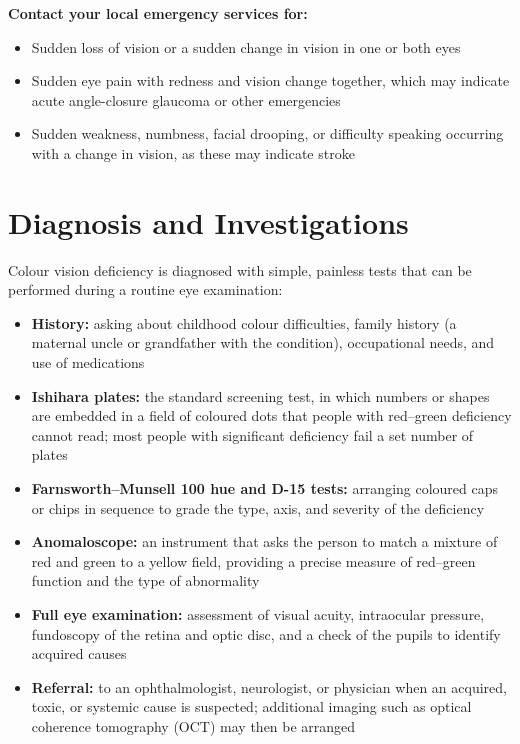 \textbf{Contact your local emergency services for:}
\begin{itemize}
    \item Sudden loss of vision or a sudden change in vision in one or both eyes
    \item Sudden eye pain with redness and vision change together, which may indicate acute angle-closure glaucoma or other emergencies
    \item Sudden weakness, numbness, facial drooping, or difficulty speaking occurring with a change in vision, as these may indicate stroke
\end{itemize}

\section*{Diagnosis and Investigations}
Colour vision deficiency is diagnosed with simple, painless tests that can be performed during a routine eye examination:

\begin{itemize}
    \item \textbf{History:} asking about childhood colour difficulties, family history (a maternal uncle or grandfather with the condition), occupational needs, and use of medications
    \item \textbf{Ishihara plates:} the standard screening test, in which numbers or shapes are embedded in a field of coloured dots that people with red--green deficiency cannot read; most people with significant deficiency fail a set number of plates
    \item \textbf{Farnsworth--Munsell 100 hue and D-15 tests:} arranging coloured caps or chips in sequence to grade the type, axis, and severity of the deficiency
    \item \textbf{Anomaloscope:} an instrument that asks the person to match a mixture of red and green to a yellow field, providing a precise measure of red--green function and the type of abnormality
    \item \textbf{Full eye examination:} assessment of visual acuity, intraocular pressure, fundoscopy of the retina and optic disc, and a check of the pupils to identify acquired causes
    \item \textbf{Referral:} to an ophthalmologist, neurologist, or physician when an acquired, toxic, or systemic cause is suspected; additional imaging such as optical coherence tomography (OCT) may then be arranged
\end{itemize}

